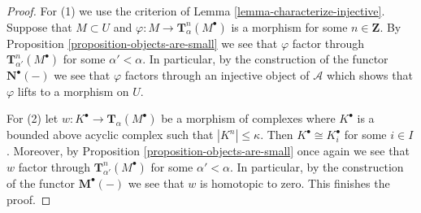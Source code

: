 \begin{proof}
\medskip\noindent
For (1) we use the criterion of
Lemma \ref{lemma-characterize-injective}.
Suppose that $M \subset U$ and $\varphi : M \to \mathbf{T}^n_\alpha(M^\bullet)$
is a morphism for some $n \in \mathbf{Z}$. By
Proposition \ref{proposition-objects-are-small}
we see that $\varphi$ factor through
$\mathbf{T}^n_{\alpha'}(M^\bullet)$ for some $\alpha' < \alpha$.
In particular, by the construction of the functor
$\mathbf{N}^\bullet(-)$ we see that $\varphi$ factors through
an injective object of $\mathcal{A}$ which shows that $\varphi$
lifts to a morphism on $U$.

\medskip\noindent
For (2) let $w : K^\bullet  \to \mathbf{T}_\alpha(M^\bullet)$
be a morphism of complexes where $K^\bullet$ is a bounded above acyclic
complex such that $|K^n| \leq \kappa$. Then $K^\bullet \cong K_i^\bullet$
for some $i \in I$. Moreover, by
Proposition \ref{proposition-objects-are-small}
once again we see that $w$ factor through
$\mathbf{T}^n_{\alpha'}(M^\bullet)$ for some $\alpha' < \alpha$.
In particular, by the construction of the functor
$\mathbf{M}^\bullet(-)$ we see that $w$ is homotopic to zero.
This finishes the proof.
\end{proof}